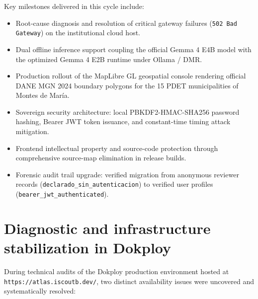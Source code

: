 \documentclass[11pt,a4paper]{article}
\begin{document}
Key milestones delivered in this cycle include:
\begin{itemize}[leftmargin=*]
    \item Root-cause diagnosis and resolution of critical gateway failures (\texttt{502 Bad Gateway}) on the institutional cloud host.
    \item Dual offline inference support coupling the official Gemma 4 E4B model with the optimized Gemma 4 E2B runtime under Ollama / DMR.
    \item Production rollout of the MapLibre GL geospatial console rendering official DANE MGN 2024 boundary polygons for the 15 PDET municipalities of Montes de Mar\'ia.
    \item Sovereign security architecture: local PBKDF2-HMAC-SHA256 password hashing, Bearer JWT token issuance, and constant-time timing attack mitigation.
    \item Frontend intellectual property and source-code protection through comprehensive source-map elimination in release builds.
    \item Forensic audit trail upgrade: verified migration from anonymous reviewer records (\texttt{declarado\_sin\_autenticacion}) to verified user profiles (\texttt{bearer\_jwt\_authenticated}).
\end{itemize}

\section{Diagnostic and infrastructure stabilization in Dokploy}

During technical audits of the Dokploy production environment hosted at \texttt{https://atlas.iscoutb.dev/}, two distinct availability issues were uncovered and systematically resolved:
\end{document}
